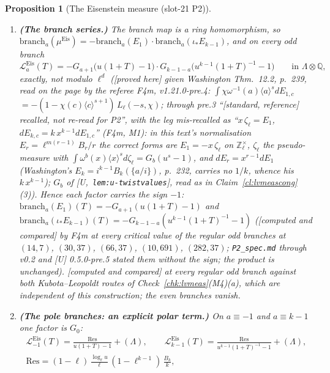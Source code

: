 \documentclass[11pt]{article}
\newtheorem{proposition}[theorem]{Proposition}
\theoremstyle{remark}
\newcommand{\Z}{\mathbb{Z}}
\newcommand{\Q}{\mathbb{Q}}
\newcommand{\PROVED}{\textsf{[proved here]}}
\newcommand{\STD}{\textsf{[standard, reference]}}
\newcommand{\CMPD}{\textsf{[computed and compared]}}   %
\newcommand{\Ucite}[1]{[U,~\texttt{#1}]}               %
\begin{document}
\begin{proposition}[The Eisenstein measure (slot-21 P2)]
\begin{enumerate}
\[  \]
  (\CMPD). Hence, for $\chi$ of conductor $\ell$ and every level $M$, $\sum_a\chi(a)\mu^{\mathrm{Eis}}(a+\ell^{M}\Z_\ell)=-B_{1,\chi}B_{k-1,\bar\chi}/(k-1)$ exactly, no Riemann sum (\PROVED{} from the
  convolution form and the distribution property of the generalised Bernoulli numbers, \STD; \CMPD{} at every odd $\chi=\omega^{i}$, (E4)).
\item \textbf{(The branch series.)} The branch map is a ring homomorphism, so $\mathrm{branch}_a(\mu^{\mathrm{Eis}})=-\mathrm{branch}_a(E_1)\cdot\mathrm{branch}_a(\iota_\ast E_{k-1})$, and on every odd branch
  \[
    \mathcal L^{\mathrm{Eis}}_a(T)=-G_{a+1}\bigl(u(1+T)-1\bigr)\cdot G_{k-1-a}\bigl(u^{k-1}(1+T)^{-1}-1\bigr)\qquad\text{in }\Lambda\otimes\Q,
  \]
  exactly, not modulo $\ell^{d}$ (\PROVED{} given Washington Thm.~12.2, p.~239, read on the page by the referee F4m, v1.21.0-pre.4: $\int\chi\omega^{-1}(a)\langle a\rangle^{s}dE_{1,c}$
  $=-(1-\chi(c)\langle c\rangle^{s+1})\,L_\ell(-s,\chi)$; through pre.3 ``\STD{} recalled, not re-read for P2'', with the leg mis-recalled as ``$x\,\zeta_\ell=E_1$, $dE_{k,c}=k\,x^{k-1}dE_{1,c}$'' (F4m, M1):
  in this text's normalisation $E_r=\ell^{m(r-1)}B_r/r$ the correct forms are $E_1=-x\,\zeta_\ell$ on $\Z_\ell^{\times}$, $\zeta_\ell$ the pseudo-measure with $\int\omega^{b}(x)\langle x\rangle^{s}d\zeta_\ell=G_b(u^{s}-1)$,
  and $dE_r=x^{r-1}dE_1$ (Washington's $E_k=i^{k-1}B_k(\{a/i\})$, p.~232, carries no $1/k$, whence his $k\,x^{k-1}$); $G_b$ of
  \Ucite{lem:u-twistvalues}, read as in Claim~\ref{cl:lvmeascong}(3)). Hence each factor carries the sign $-1$: $\mathrm{branch}_a(E_1)(T)=-G_{a+1}(u(1+T)-1)$ and
  $\mathrm{branch}_a(\iota_\ast E_{k-1})(T)=-G_{k-1-a}(u^{k-1}(1+T)^{-1}-1)$ (\CMPD{} by F4m at every critical value of the regular odd branches at $(14,7)$, $(30,37)$, $(66,37)$, $(10,691)$,
  $(282,37)$; \texttt{P2\_spec.md} through v0.2 and [U] 0.5.0-pre.5 stated them without the sign; the product is unchanged). \CMPD{} at every regular odd branch against both Kubota--Leopoldt routes of Check~\ref{chk:lvmeas}(M4)(a), which are
  independent of this construction; the even branches vanish.
\item \textbf{(The pole branches: an explicit polar term.)} On $a\equiv-1$ and $a\equiv k-1$ one factor is $G_0$:
  \begin{gather*}
    \mathcal L^{\mathrm{Eis}}_{-1}(T)=\frac{\mathrm{Res}}{u(1+T)-1}+(\Lambda),\qquad\mathcal L^{\mathrm{Eis}}_{k-1}(T)=\frac{\mathrm{Res}}{u^{k-1}(1+T)^{-1}-1}+(\Lambda),\\
    \mathrm{Res}=(1-\ell)\,\frac{\log_\ell u}{\ell}\,(1-\ell^{k-1})\,\frac{B_k}{k},

\end{gather*}
\end{enumerate}
\end{proposition}
\end{document}
